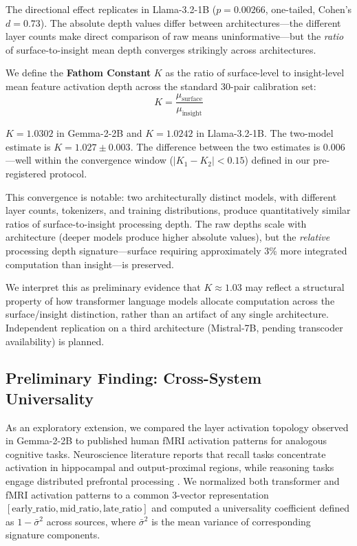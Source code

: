 \documentclass[10pt]{article}
\begin{document}
The directional effect replicates in Llama-3.2-1B ($p = 0.00266$, one-tailed, Cohen's $d = 0.73$). The absolute depth values differ between architectures---the different layer counts make direct comparison of raw means uninformative---but the \textit{ratio} of surface-to-insight mean depth converges strikingly across architectures.

We define the \textbf{Fathom Constant} $K$ as the ratio of surface-level to insight-level mean feature activation depth across the standard 30-pair calibration set:
\begin{equation}
K = \frac{\mu_\text{surface}}{\mu_\text{insight}}
\end{equation}

$K = 1.0302$ in Gemma-2-2B and $K = 1.0242$ in Llama-3.2-1B. The two-model estimate is $K = 1.027 \pm 0.003$. The difference between the two estimates is $0.006$---well within the convergence window ($|K_1 - K_2| < 0.15$) defined in our pre-registered protocol.

This convergence is notable: two architecturally distinct models, with different layer counts, tokenizers, and training distributions, produce quantitatively similar ratios of surface-to-insight processing depth. The raw depths scale with architecture (deeper models produce higher absolute values), but the \textit{relative} processing depth signature---surface requiring approximately 3\% more integrated computation than insight---is preserved.

We interpret this as preliminary evidence that $K \approx 1.03$ may reflect a structural property of how transformer language models allocate computation across the surface/insight distinction, rather than an artifact of any single architecture. Independent replication on a third architecture (Mistral-7B, pending transcoder availability) is planned.

\subsection{Preliminary Finding: Cross-System Universality}
\label{sec:universality}

As an exploratory extension, we compared the layer activation topology observed in Gemma-2-2B to published human fMRI activation patterns for analogous cognitive tasks. Neuroscience literature reports that recall tasks concentrate activation in hippocampal and output-proximal regions, while reasoning tasks engage distributed prefrontal processing \citep{miller2001integrative}. We normalized both transformer and fMRI activation patterns to a common 3-vector representation $[\text{early\_ratio}, \text{mid\_ratio}, \text{late\_ratio}]$ and computed a universality coefficient defined as $1 - \bar{\sigma}^2$ across sources, where $\bar{\sigma}^2$ is the mean variance of corresponding signature components.
\end{document}
